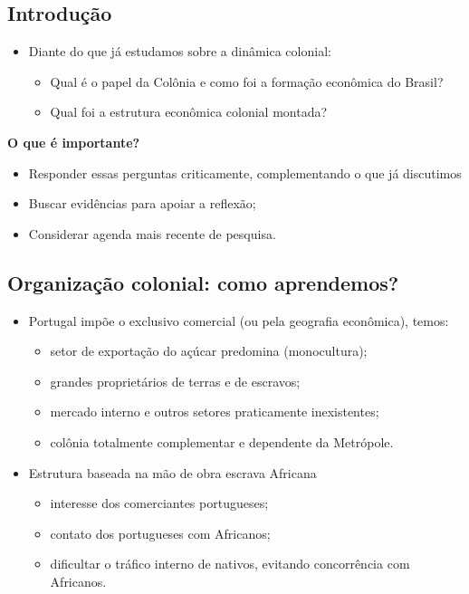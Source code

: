 \documentclass[a4paper,12pt]{article}[abntex2]
\begin{document}
\subsection{\textbf{Introdução}}

\begin{itemize}
    \item Diante do que já estudamos sobre a dinâmica colonial:
    \begin{itemize}
        \item Qual é o papel da Colônia e como foi a formação econômica do Brasil?
        \item Qual foi a estrutura econômica colonial montada?
    \end{itemize}
\end{itemize}

\textbf{O que é importante?}
\begin{itemize}
    \item Responder essas perguntas criticamente, complementando o que já discutimos
    \item Buscar evidências para apoiar a reflexão;
    \item Considerar agenda mais recente de pesquisa.
\end{itemize}


\subsection{\textbf{Organização colonial: como aprendemos?}}

\begin{itemize}
    \item Portugal impõe o exclusivo comercial (ou pela geografia econômica), temos:
    \begin{itemize}
        \item setor de exportação do açúcar predomina (monocultura);
        \item grandes proprietários de terras e de escravos;
        \item mercado interno e outros setores praticamente inexistentes;
        \item colônia totalmente complementar e dependente da Metrópole.
    \end{itemize}
\end{itemize}

\begin{itemize}
    \item Estrutura baseada na mão de obra escrava Africana
    \begin{itemize}
        \item interesse dos comerciantes portugueses;
        \item contato dos portugueses com Africanos;
        \item dificultar o tráfico interno de nativos, evitando concorrência com Africanos.
    \end{itemize}
\end{itemize}
\end{document}
